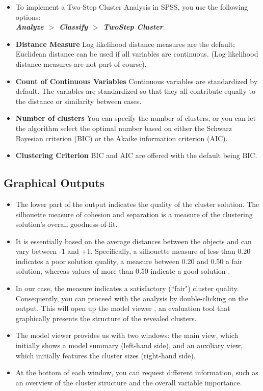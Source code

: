 \documentclass[a4paper,12pt]{article}
\begin{document}
\begin{itemize}
\item To implement a Two-Step Cluster Analysis in SPSS, you use the following options:\\
\textbf{\textit{Analyze $>$ Classify $>$ TwoStep Cluster}}.

\item \textbf{Distance Measure} Log likelihood distance measures are the default; Euclidean distance can be used if all variables are continuous. (Log likelihood distance measures are not part of course).

\item \textbf{Count of Continuous Variables} Continuous variables are standardized by default. The variables
are standardized so that they all contribute equally to the distance or similarity between cases.

\item \textbf{Number of clusters} You can specify the number of clusters, or you can let the algorithm select
the optimal number based on either the Schwarz Bayesian criterion (BIC) or the Akaike
information criterion (AIC).

\item \textbf{Clustering Criterion} BIC and AIC are offered with the default being BIC.
\end{itemize}


\subsection{Graphical Outputs}
\begin{itemize}
    \item 
The lower part of the output  indicates the quality of the cluster
solution. The silhouette measure of cohesion and separation is a measure of the
clustering solution’s overall goodness-of-fit. 
\item It is essentially based on the average
distances between the objects and can vary between -1 and +1. Specifically, a
silhouette measure of less than 0.20 indicates a poor solution quality, a measure
between 0.20 and 0.50 a fair solution, whereas values of more than 0.50 indicate a
good solution . 
\item In our case, the measure indicates a satisfactory (``fair") cluster quality. Consequently, you can
proceed with the analysis by double-clicking on the output. This will open up the
model viewer , an evaluation tool that graphically presents the structure
of the revealed clusters.
\item 

The model viewer provides us with two windows: the main view, which initially
shows a model summary (left-hand side), and an auxiliary view, which initially
features the cluster sizes (right-hand side).
\item At the bottom of each window, you can
request different information, such as an overview of the cluster structure and the
overall variable importance.
\end{itemize}
\end{document}
